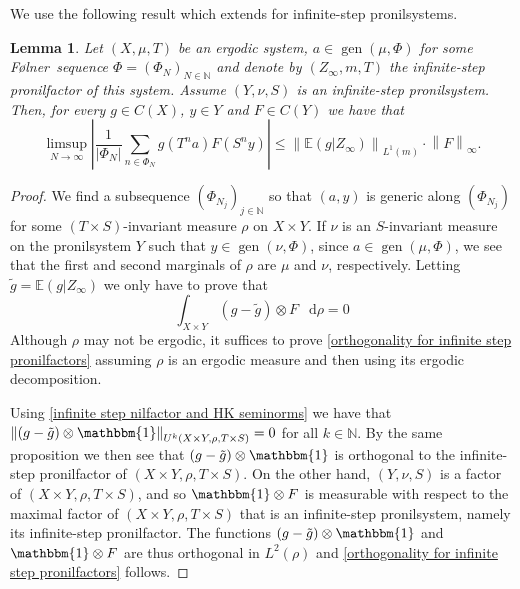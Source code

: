 \documentclass[letter, 11pt]{article}
\newcommand{\Folner}{F\o{}lner}
\newtheorem{lemma}[theo]{Lemma}
\theoremstyle{definition}
\theoremstyle{plain}
\newcommand{\N}{\mathbb{N}}
\DeclareMathOperator\gen{gen}
\newcommand{\norm}[1]{\left\lVert#1\right\rVert}
\newcommand*\diff{\mathop{}\!\mathrm{d}}
\providecommand{\norm}[1]{\lVert #1\rVert}
\newcommand{\1}{\mathbbm{1}}
\begin{document}
We   use the following result which extends \cite[Lemma $6.11$]{kmrr25} for infinite-step pronilsystems. 

\begin{lemma}\label{6.11 from kmrr25}
Let $(X,\mu,T)$ be an ergodic system, $a\in \gen(\mu,\Phi)$ for some \Folner\ sequence $\Phi=(\Phi_N)_{N\in \N}$ and denote by $(Z_{\infty},m,T)$ the infinite-step pronilfactor of this system. Assume $(Y,\nu,S)$ is an infinite-step pronilsystem. Then, for every $g\in C(X)$, $y\in Y$ and $F\in C(Y)$ we have that
\begin{equation}\label{equation of 6.11}
\limsup_{N\to \infty} \left| \frac{1}{|\Phi_N|} \sum_{n\in \Phi_N} g(T^na)F(S^ny)\right| \leq \norm{\mathbb{E}(g|Z_{\infty})}_{L^1(m)} \cdot \norm{F}_{\infty}.      
\end{equation}
\end{lemma}

\begin{proof}
We find a subsequence $(\Phi_{N_j})_{j\in \N}$ so that $(a,y)$ is generic along $(\Phi_{N_j})$ for some $(T\times S)$-invariant measure $\rho$ on $X\times Y$. If $\nu$ is an $S$-invariant measure on the pronilsystem $Y$ such that $y\in \gen(\nu,\Phi)$, since $a\in \gen(\mu,\Phi)$, we see that the first and second marginals of $\rho$ are $\mu$ and $\nu$, respectively. Letting $\tilde{g}=\mathbb{E}(g | Z_{\infty})$ we only have to prove that 
\begin{equation}\label{orthogonality for infinite step pronilfactors}
\int_{X\times Y} \left(g-\tilde{g}\right) \otimes F\ \diff \rho=0    
\end{equation}
Although $\rho$ may not be ergodic, it suffices to prove \eqref{orthogonality for infinite step pronilfactors} assuming $\rho$ is an ergodic measure and then using its ergodic decomposition.

Using \cref{infinite step nilfactor and HK seminorms} we have that 
$\norm{(g-\tilde{g}) \otimes \mathbbm{1}}_{U^k(X\times Y,\rho,T\times S)}=0$ for all $k\in \N$. By the same proposition we then see that $(g-\tilde{g}) \otimes \mathbbm{1}$ is orthogonal to the infinite-step pronilfactor of $(X\times Y,\rho,T\times S)$. On the other hand, $(Y,\nu,S)$ is a factor of $(X\times Y,\rho,T\times S)$, and so $\mathbbm{1} \otimes F$ is measurable with respect to the maximal factor of $(X\times Y,\rho,T\times S)$ that is an infinite-step pronilsystem, namely its infinite-step pronilfactor. The functions $(g-\tilde{g}) \otimes \mathbbm{1}$ and $\mathbbm{1} \otimes F$ are thus orthogonal in $L^2(\rho)$  and \eqref{orthogonality for infinite step pronilfactors} follows.
\end{proof}
\end{document}
